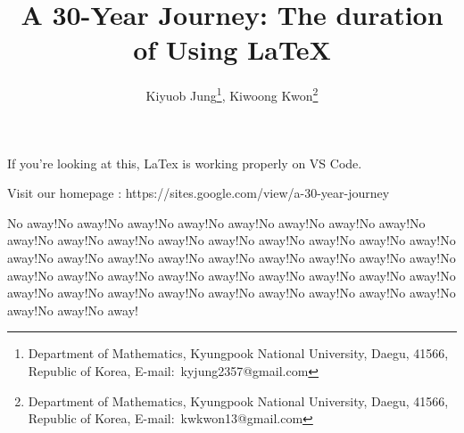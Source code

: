\documentclass[a4paper,11pt]{article}
\title{
    A 30-Year Journey: The duration of Using LaTeX
    }
\author{
    Kiyuob Jung\thanks{Department of Mathematics, Kyungpook National University, Daegu, 41566, Republic of Korea, E-mail:~kyjung2357@gmail.com},
    Kiwoong Kwon\thanks{Department of Mathematics, Kyungpook National University, Daegu, 41566, Republic of Korea, E-mail:~kwkwon13@gmail.com}
    }
\begin{document}
\date{}
\maketitle

If you're looking at this, LaTex is working properly on VS Code.

Visit our homepage : https://sites.google.com/view/a-30-year-journey

No away!No away!No away!No away!No away!No away!No away!No away!No away!No away!No away!No away!No away!No away!No away!No away!No away!No away!No away!No away!No away!No away!No away!No away!No away!No away!No away!No away!No away!No away!No away!No away!No away!No away!No away!No away!No away!No away!No away!No away!No away!No away!No away!No away!No away!No away!No away!
\end{document}
